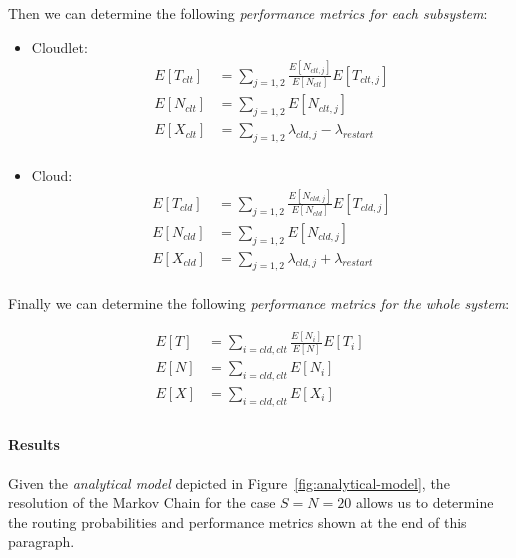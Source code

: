 Then we can determine the following \textit{performance metrics for each subsystem}:

\begin{itemize}
	\item Cloudlet:
	\begin{equation} 
	\begin{split}
	E[T_{clt}] &= \sum_{j=1,2}\frac{E[N_{clt,j}]}{E[N_{clt}]}E[T_{clt,j}] \\
	E[N_{clt}] &= \sum_{j=1,2}E[N_{clt,j}] \\
	E[X_{clt}] &= \sum_{j=1,2}\lambda_{cld,j}-\lambda_{restart} \\
	\end{split}
	\end{equation}
	
	\item Cloud:
	\begin{equation} 
	\begin{split}
	E[T_{cld}] &= \sum_{j=1,2}\frac{E[N_{cld,j}]}{E[N_{cld}]}E[T_{cld,j}] \\
	E[N_{cld}] &= \sum_{j=1,2}E[N_{cld,j}] \\
	E[X_{cld}] &= \sum_{j=1,2}\lambda_{cld,j}+\lambda_{restart} \\
	\end{split}
	\end{equation}

\end{itemize}

Finally we can determine the following \textit{performance metrics for the whole system}:

\begin{equation} 
\begin{split}
E[T] &= \sum_{i=cld,clt}\frac{E[N_{i}]}{E[N]}E[T_{i}] \\
E[N] &= \sum_{i=cld,clt}E[N_{i}] \\
E[X] &= \sum_{i=cld,clt}E[X_{i}] \\
\end{split}
\end{equation}



\paragraph{Results}
Given the \textit{analytical model} depicted in Figure~\ref{fig:analytical-model}, the resolution of the Markov Chain for the case $S=N=20$ allows us to determine the routing probabilities and performance metrics shown at the end of this paragraph.

